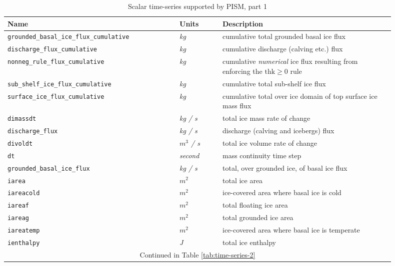 \begin{table}[ht]
  \centering
 \begin{tabular}{p{0.4\linewidth}p{0.1\linewidth}p{0.4\linewidth}}
    \toprule
    \textbf{Name} & \textbf{Units} & \textbf{Description}\\
    \midrule
    \texttt{grounded_basal_ice_flux_cumulative} & \textsl{kg} &  cumulative total grounded basal ice flux \\
    \texttt{discharge_flux_cumulative} & \textsl{kg} &  cumulative discharge (calving etc.) flux \\
    \texttt{nonneg_rule_flux_cumulative} & \textsl{kg} &  cumulative \emph{numerical} ice flux resulting from enforcing the $\mathrm{thk} \ge 0$ rule \\
    \texttt{sub_shelf_ice_flux_cumulative} & \textsl{kg} &  cumulative total sub-shelf ice flux \\
    \texttt{surface_ice_flux_cumulative} & \textsl{kg} &  cumulative total over ice domain of top surface ice mass flux \\
    \texttt{dimassdt} & \textsl{kg  / s} &  total ice mass rate of change \\
    \texttt{discharge_flux} & \textsl{kg  / s} &  discharge (calving and icebergs) flux \\
    \texttt{divoldt} & \textsl{$m^{3}$  / s} &  total ice volume rate of change \\
    \texttt{dt} & \textsl{second} &  mass continuity time step \\
    \texttt{grounded_basal_ice_flux} & \textsl{kg  / s} &  total, over grounded ice, of basal ice flux \\
    \texttt{iarea} & \textsl{$m^{2}$} &  total ice area \\
    \texttt{iareacold} & \textsl{$m^{2}$} &  ice-covered area where basal ice is cold \\
    \texttt{iareaf} & \textsl{$m^{2}$} &  total floating ice area \\
    \texttt{iareag} & \textsl{$m^{2}$} &  total grounded ice area \\
    \texttt{iareatemp} & \textsl{$m^{2}$} &  ice-covered area where basal ice is temperate \\
    \texttt{ienthalpy} & \textsl{J} &  total ice enthalpy \\
    \multicolumn{3}{c}{Continued in Table \ref{tab:time-series-2}}\\
    \bottomrule
  \end{tabular}
\caption{Scalar time-series supported by PISM, part 1}
\label{tab:time-series-1}
\end{table}

